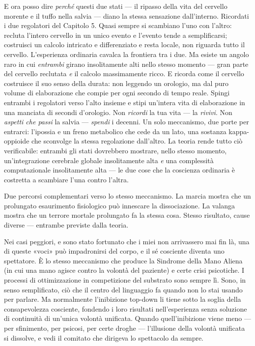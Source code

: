 \documentclass[11pt, twoside, openright]{book}
\begin{document}
E ora posso dire \textit{perché} questi due stati --- il ripasso della vita del cervello morente e il tuffo nella salvia --- diano la stessa sensazione dall'interno. Ricordati i due regolatori del Capitolo 5. Quasi sempre si scambiano l'uno con l'altro: recluta l'intero cervello in un unico evento e l'evento tende a semplificarsi; costruisci un calcolo intricato e differenziato e resta locale, non riguarda tutto il cervello. L'esperienza ordinaria cavalca la frontiera tra i due. Ma esiste un angolo raro in cui \textit{entrambi} girano insolitamente alti nello stesso momento --- gran parte del cervello reclutata \textit{e} il calcolo massimamente ricco. E ricorda come il cervello costruisce il suo senso della durata: non leggendo un orologio, ma dal puro volume di elaborazione che compie per ogni secondo di tempo reale. Spingi entrambi i regolatori verso l'alto insieme e stipi un'intera vita di elaborazione in una manciata di secondi d'orologio. Non \textit{ricordi} la tua vita --- la \textit{rivivi}. Non \textit{aspetti che passi} la salvia --- \textit{spendi} i decenni. Un solo meccanismo, due porte per entrarci: l'ipossia e un freno metabolico che cede da un lato, una sostanza kappa-oppioide che sconvolge la stessa regolazione dall'altro. La teoria rende tutto ciò verificabile: entrambi gli stati dovrebbero mostrare, nello stesso momento, un'integrazione cerebrale globale insolitamente alta \textit{e} una complessità computazionale insolitamente alta --- le due cose che la coscienza ordinaria è costretta a scambiare l'una contro l'altra.

Due percorsi complementari verso lo stesso meccanismo. La marcia mostra che un prolungato esaurimento fisiologico può innescare la dissociazione. La valanga mostra che un terrore mortale prolungato fa la stessa cosa. Stesso risultato, cause diverse --- entrambe previste dalla teoria.

Nei casi peggiori, e sono stato fortunato che i miei non arrivassero mai fin là, una di queste «voci» può impadronirsi del corpo, e il sé cosciente diventa uno spettatore. È lo stesso meccanismo che produce la Sindrome della Mano Aliena (in cui una mano agisce contro la volontà del paziente) e certe crisi psicotiche. I processi di ottimizzazione in competizione del substrato sono sempre lì. Sono, in senso semplificato, ciò che il centro del linguaggio fa quando non lo stai usando per parlare. Ma normalmente l'inibizione top-down li tiene sotto la soglia della consapevolezza cosciente, fondendo i loro risultati nell'esperienza senza soluzione di continuità di un'unica volontà unificata. Quando quell'inibizione viene meno --- per sfinimento, per psicosi, per certe droghe --- l'illusione della volontà unificata si dissolve, e vedi il comitato che dirigeva lo spettacolo da sempre.
\end{document}
